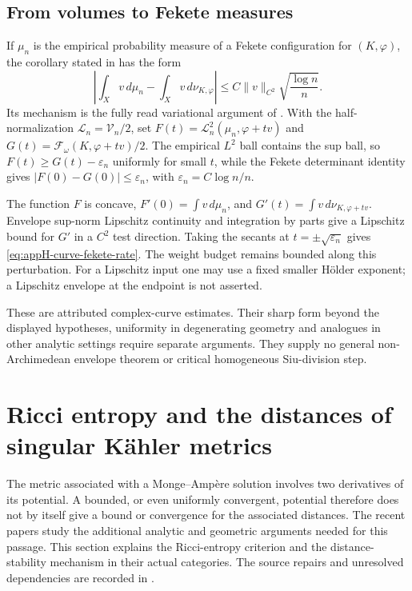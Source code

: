 \subsection{From volumes to Fekete measures}

If $\mu_n$ is the empirical probability measure of a Fekete
configuration for $(K,\varphi)$, the corollary stated in
\cite{Wu26SectionBallRatesV1} has the form
\[
 \left|\int_Xv\,d\mu_n-\int_Xv\,d\nu_{K,\varphi}\right|
       \leq C\|v\|_{C^2}\sqrt{\frac{\log n}{n}}.
 \tag{H.155}\label{eq:appH-curve-fekete-rate}
\]
Its mechanism is the fully read variational argument of
\cite[Lemmas~3.13--3.14 and \S3.3]{DMN17FeketePublished}.
With the half-normalization $\mathcal L_n=\mathcal V_n/2$,
set $F(t)=\mathcal L_n^2(\mu_n,\varphi+tv)$ and
$G(t)=\mathcal F_\omega(K,\varphi+tv)/2$. The empirical
$L^2$ ball contains the sup ball, so $F(t)\geq G(t)-\varepsilon_n$
uniformly for small $t$, while the Fekete determinant identity
gives $|F(0)-G(0)|\leq\varepsilon_n$, with
$\varepsilon_n=C\log n/n$.

The function $F$ is concave, $F'(0)=\int v\,d\mu_n$, and
$G'(t)=\int v\,d\nu_{K,\varphi+tv}$. Envelope sup-norm
Lipschitz continuity and integration by parts give a Lipschitz
bound for $G'$ in a $C^2$ test direction. Taking the secants
at $t=\pm\sqrt{\varepsilon_n}$ gives
\eqref{eq:appH-curve-fekete-rate}. The weight budget remains
bounded along this perturbation. For a Lipschitz input one
may use a fixed smaller H\"older exponent; a Lipschitz
envelope at the endpoint is not asserted.

These are attributed complex-curve estimates. Their sharp
form beyond the displayed hypotheses, uniformity in degenerating
geometry and analogues in other analytic settings require
separate arguments. They supply no general non-Archimedean
envelope theorem or critical homogeneous Siu-division step.


\section{Ricci entropy and the distances of singular Kähler metrics}
\label{sec:appH-ricci-entropy}

The metric associated with a Monge--Ampère solution involves two
derivatives of its potential. A bounded, or even uniformly convergent,
potential therefore does not by itself give a bound or convergence for
the associated distances. The recent papers
\cite{GSS26RicciEntropyV1,GSS26GeometricHolderV1,GSS26GeometricStabilityV1}
study the additional analytic and geometric arguments needed for this
passage. This section explains the Ricci-entropy criterion and the
distance-stability mechanism in their actual categories. The source
repairs and unresolved dependencies are recorded in
.

